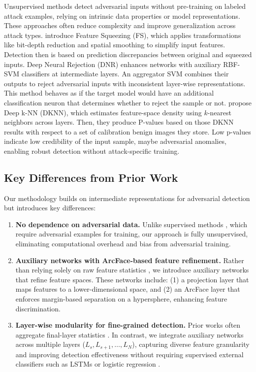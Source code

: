 Unsupervised methods detect adversarial inputs without pre-training on labeled attack examples, relying on intrinsic data properties or model representations. These approaches often reduce complexity and improve generalization across attack types. \citet{xu2017feature} introduce Feature Squeezing (FS), which applies transformations like bit-depth reduction and spatial smoothing to simplify input features. Detection then is based on prediction discrepancies between original and squeezed inputs. Deep Neural Rejection (DNR) \citep{sotgiu2020deep} enhances networks with auxiliary RBF-SVM classifiers at intermediate layers. An aggregator SVM combines their outputs to reject adversarial inputs with inconsistent layer-wise representations. This method behaves as if the target model would have an additional classification neuron that determines whether to reject the sample or not. \citet{papernot2018deep} propose Deep k-NN (DKNN), which estimates feature-space density using $k$-nearest neighbors across layers. Then, they produce P-values based on those DKNN results with respect to a set of calibration benign images they store. Low p-values indicate low credibility of the input sample, maybe adversarial anomalies, enabling robust detection without attack-specific training.

\subsection{Key Differences from Prior Work}
Our methodology builds on intermediate representations for adversarial detection but introduces key differences:
\begin{enumerate}
    \item \textbf{No dependence on adversarial data.} Unlike supervised methods \citep{lee2018simple,carrara2018adversarial}, which require adversarial examples for training, our approach is fully unsupervised, eliminating computational overhead and bias from adversarial training.
    \item \textbf{Auxiliary networks with ArcFace-based feature refinement.} Rather than relying solely on raw feature statistics \citep{papernot2018deep,carrara2018adversarial,sotgiu2020deep}, we introduce auxiliary networks that refine feature spaces. These networks include: (1) a projection layer that maps features to a lower-dimensional space, and (2) an ArcFace layer that enforces margin-based separation on a hypersphere, enhancing feature discrimination.
    \item \textbf{Layer-wise modularity for fine-grained detection.} Prior works often aggregate final-layer statistics \citep{lee2018simple,sotgiu2020deep}. In contrast, we integrate auxiliary networks across multiple layers ($L_{s}, L_{s+1}, \dots, L_{N}$), capturing diverse feature granularity and improving detection effectiveness without requiring supervised external classifiers such as LSTMs or logistic regression \citep{carrara2018adversarial,lee2018simple}.
\end{enumerate}